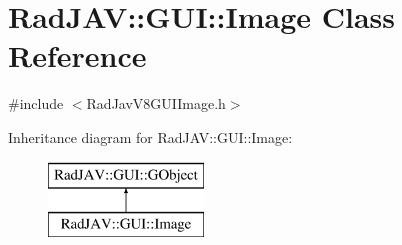 \hypertarget{class_rad_j_a_v_1_1_g_u_i_1_1_image}{}\section{Rad\+J\+AV\+:\+:G\+UI\+:\+:Image Class Reference}
\label{class_rad_j_a_v_1_1_g_u_i_1_1_image}


{\ttfamily \#include $<$Rad\+Jav\+V8\+G\+U\+I\+Image.\+h$>$}

Inheritance diagram for Rad\+J\+AV\+:\+:G\+UI\+:\+:Image\+:\begin{figure}[H]
\begin{center}
\leavevmode
\includegraphics[height=2.000000cm]{class_rad_j_a_v_1_1_g_u_i_1_1_image}
\end{center}
\end{figure}

